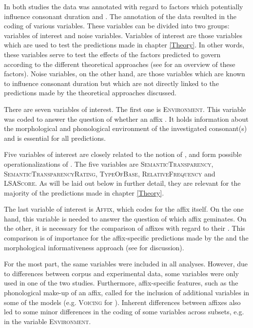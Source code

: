 In both studies the data was annotated with regard to factors which potentially influence consonant duration and . The annotation of the data resulted in the coding of various variables.
 These variables can be divided into two groups: variables of interest and noise variables. Variables of interest are those variables which are used to test the predictions made in chapter \ref{Theory}. In other words, these variables serve to test the effects of the factors predicted to govern  according to the different theoretical approaches (see  for an overview of these factors).
Noise variables, on the other hand, are those variables which are known to influence consonant duration but which are not directly linked to the predictions made by the theoretical approaches discussed.

There are seven variables of interest. The first one is \textsc{Environment}. This variable was coded to answer the question of whether an affix . It holds information about the morphological and phonological environment of the investigated consonant(s) and is essential for all predictions.


Five variables of interest are closely related to the notion of ,  and form possible operationalizations of . The five variables are \textsc{SemanticTransparency}, \textsc{SemanticTransparencyRating}, \textsc{TypeOfBase}, \textsc{RelativeFrequency} and \textsc{LSAScore}. As will be laid out below in further detail, they are relevant for the majority of the predictions made in chapter \ref{Theory}. 


The last variable of interest is \textsc{Affix}, which codes for the affix itself. On the one hand, this variable is needed to answer the question of which affix {geminates}. On the other, it is necessary for the comparison of affixes with regard to their . This comparison is of importance for the affix-specific predictions made by the  and the morphological informativeness approach (see  for discussion). 


For the most part, the same variables were included in all analyses. However, due to differences between corpus and experimental data, some variables were only used in one of the two studies. 
 Furthermore, affix-specific features, such as the phonological make-up of an affix, called for the inclusion of additional variables in some of the models (e.g. \textsc{Voicing} for ). Inherent differences between affixes also led to some minor differences in the coding of some variables across subsets, e.g. in the variable \textsc{Environment}. 
 
